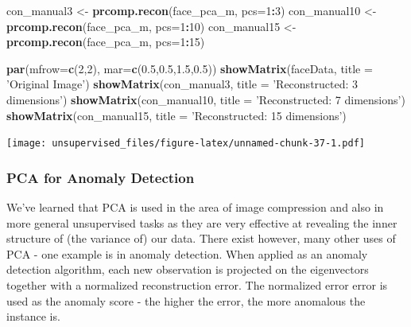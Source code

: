 \documentclass[]{article}
\newenvironment{Shaded}{\begin{snugshade}}{\end{snugshade}}
\newcommand{\DataTypeTok}[1]{\textcolor[rgb]{0.13,0.29,0.53}{#1}}
\newcommand{\DecValTok}[1]{\textcolor[rgb]{0.00,0.00,0.81}{#1}}
\newcommand{\FloatTok}[1]{\textcolor[rgb]{0.00,0.00,0.81}{#1}}
\newcommand{\KeywordTok}[1]{\textcolor[rgb]{0.13,0.29,0.53}{\textbf{#1}}}
\newcommand{\NormalTok}[1]{#1}
\newcommand{\OperatorTok}[1]{\textcolor[rgb]{0.81,0.36,0.00}{\textbf{#1}}}
\newcommand{\StringTok}[1]{\textcolor[rgb]{0.31,0.60,0.02}{#1}}
\begin{document}
\begin{Shaded}
\begin{Highlighting}[]
\NormalTok{con_manual3 <-}\StringTok{ }\KeywordTok{prcomp.recon}\NormalTok{(face_pca_m, }\DataTypeTok{pcs=}\DecValTok{1}\OperatorTok{:}\DecValTok{3}\NormalTok{)}
\NormalTok{con_manual10 <-}\StringTok{ }\KeywordTok{prcomp.recon}\NormalTok{(face_pca_m, }\DataTypeTok{pcs=}\DecValTok{1}\OperatorTok{:}\DecValTok{10}\NormalTok{)}
\NormalTok{con_manual15 <-}\StringTok{ }\KeywordTok{prcomp.recon}\NormalTok{(face_pca_m, }\DataTypeTok{pcs=}\DecValTok{1}\OperatorTok{:}\DecValTok{15}\NormalTok{)}

\KeywordTok{par}\NormalTok{(}\DataTypeTok{mfrow=}\KeywordTok{c}\NormalTok{(}\DecValTok{2}\NormalTok{,}\DecValTok{2}\NormalTok{), }\DataTypeTok{mar=}\KeywordTok{c}\NormalTok{(}\FloatTok{0.5}\NormalTok{,}\FloatTok{0.5}\NormalTok{,}\FloatTok{1.5}\NormalTok{,}\FloatTok{0.5}\NormalTok{))}
\KeywordTok{showMatrix}\NormalTok{(faceData, }\DataTypeTok{title =} \StringTok{'Original Image'}\NormalTok{)}
\KeywordTok{showMatrix}\NormalTok{(con_manual3, }\DataTypeTok{title =} \StringTok{'Reconstructed: 3 dimensions'}\NormalTok{)}
\KeywordTok{showMatrix}\NormalTok{(con_manual10, }\DataTypeTok{title =} \StringTok{'Reconstructed: 7 dimensions'}\NormalTok{)}
\KeywordTok{showMatrix}\NormalTok{(con_manual15, }\DataTypeTok{title =} \StringTok{'Reconstructed: 15 dimensions'}\NormalTok{)}
\end{Highlighting}
\end{Shaded}

\texttt{[image: unsupervised\_files/figure-latex/unnamed-chunk-37-1.pdf]}

\hypertarget{pca-for-anomaly-detection}{%
\subsubsection{PCA for Anomaly
Detection}\label{pca-for-anomaly-detection}}

We've learned that PCA is used in the area of image compression and also
in more general unsupervised tasks as they are very effective at
revealing the inner structure of (the variance of) our data. There exist
however, many other uses of PCA - one example is in anomaly detection.
When applied as an anomaly detection algorithm, each new observation is
projected on the eigenvectors together with a normalized reconstruction
error. The normalized error error is used as the anomaly score - the
higher the error, the more anomalous the instance is.
\end{document}
